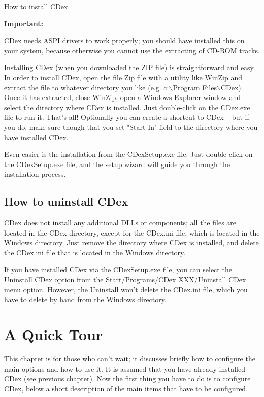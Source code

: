 How to install CDex.

{\bf Important:}

CDex needs ASPI drivers to work properly; you should have
installed this on your system, because otherwise you cannot use the extracting of
CD-ROM tracks.

Installing CDex (when you downloaded the ZIP file) is straightforward and easy.
In order to install CDex, open the file Zip file with a utility like WinZip
 and extract the file to whatever directory you like (e.g. c:$\backslash$Program Files$\backslash$CDex).
Once it has extracted, close WinZip, open a Windows Explorer window and select the directory
where CDex is installed. Just double-click on the CDex.exe file to run it. That's all!
Optionally you can create a shortcut to CDex -- but if you do, make sure though that you set
"Start In" field to the directory where you have installed CDex.

Even easier is the installation from the CDexSetup.exe file. Just double click on the
CDexSetup.exe file, and the setup wizard will guide you through the installation process.


\section{How to uninstall CDex}

CDex does not install any additional DLLs or components; all the files are
located in the CDex directory, except for the CDex.ini file, which is located in
the Windows directory. Just remove the directory where CDex is installed,
and delete the CDex.ini file that is located in the
Windows directory.

If you have installed CDex via the CDexSetup.exe file, you can select the Uninstall
CDex option from the Start/Programs/CDex XXX/Uninstall CDex menu option. However, the
Uninstall won't delete the CDex.ini file, which you have to delete by hand from the
Windows directory.

\chapter{A Quick Tour}
\setfooter{\thepage}{}{}{}{}{\thepage}

This chapter is for those who can't wait; it discusses briefly how to
configure the main options and how to use it. It is assumed that you have
already installed CDex (see previous chapter). Now the first thing you
have to do is to configure CDex, below a short description of the main
items that have to be configured.

